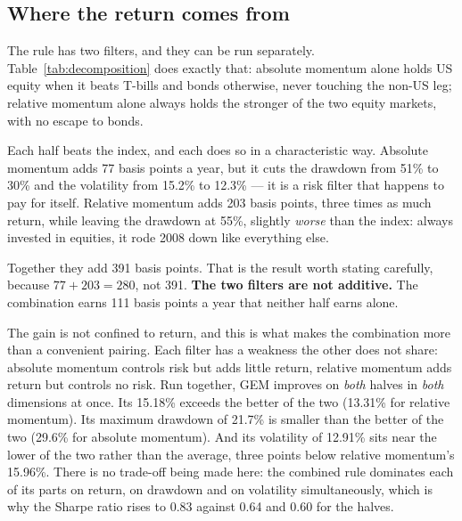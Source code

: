 \documentclass[11pt,a4paper]{article}
\let\oldsubsection\subsection
\renewcommand{\subsection}{\FloatBarrier\oldsubsection}
\begin{document}
\subsection{Where the return comes from}

The rule has two filters, and they can be run separately.
Table~\ref{tab:decomposition} does exactly that: absolute momentum alone holds
US equity when it beats T-bills and bonds otherwise, never touching the non-US
leg; relative momentum alone always holds the stronger of the two equity
markets, with no escape to bonds.

\begin{table}[!ht]
  \centering
  \caption{Decomposition: what each momentum filter contributes.}
  \label{tab:decomposition}
  
\end{table}

Each half beats the index, and each does so in a characteristic way. Absolute
momentum adds 77 basis points a year, but it cuts the drawdown from 51\% to
30\% and the volatility from 15.2\% to 12.3\% --- it is a risk filter that
happens to pay for itself. Relative momentum adds 203 basis points, three times
as much return, while leaving the drawdown at 55\%, slightly \emph{worse} than
the index: always invested in equities, it rode 2008 down like everything else.

Together they add 391 basis points. That is the result worth stating carefully,
because $77 + 203 = 280$, not 391. \textbf{The two filters are not additive.}
The combination earns 111 basis points a year that neither half earns alone.

The gain is not confined to return, and this is what makes the combination more
than a convenient pairing. Each filter has a weakness the other does not share:
absolute momentum controls risk but adds little return, relative momentum adds
return but controls no risk. Run together, GEM improves on \emph{both} halves in
\emph{both} dimensions at once. Its 15.18\% exceeds the better of the two
(13.31\% for relative momentum). Its maximum drawdown of 21.7\% is smaller than
the better of the two (29.6\% for absolute momentum). And its volatility of
12.91\% sits near the lower of the two rather than the average, three points
below relative momentum's 15.96\%. There is no trade-off being made here: the
combined rule dominates each of its parts on return, on drawdown and on
volatility simultaneously, which is why the Sharpe ratio rises to 0.83 against
0.64 and 0.60 for the halves.
\end{document}
